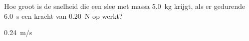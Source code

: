 

\item{}Hoe groot is de snelheid die een slee met massa \SI{5,0}{kg} krijgt, als er gedurende \SI{6,0}{s} een kracht van \SI{0,20}{N} op werkt?

\begin{oplossing}
\SI{0,24}{m/s}
\end{oplossing}
